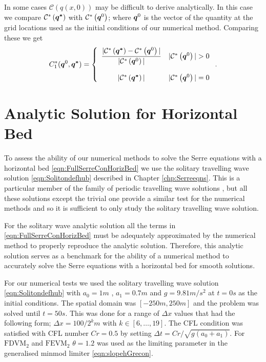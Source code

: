 In some cases $\mathcal{C}\left({q(x,0)} \right)$ may be difficult to derive analytically. In this case we compare $\mathcal{C}^*\left(\boldsymbol{q^*}\right)$ with $\mathcal{C}^*\left(\boldsymbol{q}^0\right)$; where $\boldsymbol{q}^0$ is the vector of the quantity at the grid locations used as the initial conditions of our numerical method. Comparing these we get 
\begin{equation}
C^*_1({\boldsymbol{q}^0},\boldsymbol{q^*}) =  \left\lbrace \begin{array}{c r} 
\dfrac{|\mathcal{C}^*\left({\boldsymbol{q^*}}\right) - \mathcal{C}^*\left({\boldsymbol{q}^0}\right)| }{|\mathcal{C}^*\left({\boldsymbol{q}^0}\right)|} & |\mathcal{C}^*\left({\boldsymbol{q}^0}\right)| > 0 \\ \\
|\mathcal{C}^*\left({\boldsymbol{q^*}}\right)| & |\mathcal{C}^*\left({\boldsymbol{q}^0}\right)| = 0  \end{array}\right. . 
\label{eqn:C*1qdef} 
\end{equation}


\section{Analytic Solution for Horizontal Bed}
To assess the ability of our numerical methods to solve the Serre equations with a horizontal bed \eqref{eqn:FullSerreConHorizBed} we use the solitary travelling wave solution \eqref{eqn:Solitondefhub} described in Chapter \ref{chp:Serreeqns}. This is a particular member of the family of periodic travelling wave solutions \cite{El-etal-2006}, but all these solutions except the trivial one provide a similar test for the numerical methods and so it is sufficient to only study the solitary travelling wave solution.

For the solitary wave analytic solution all the terms in \eqref{eqn:FullSerreConHorizBed} must be adequately approximated by the numerical method to properly reproduce the analytic solution. Therefore, this analytic solution serves as a benchmark for the ability of a numerical method to accurately solve the Serre equations with a horizontal bed for smooth solutions.

For our numerical tests we used the solitary travelling wave solution \eqref{eqn:Solitondefhub} with $a_0 = 1m$ , $a_1 = 0.7m$ and $g= 9.81m/s^2$ at $t=0s$ as the initial conditions. The spatial domain was $[-250m,250m]$ and the problem was solved until $t= 50s$. This was done for a range of $\Delta x$ values that had the following form; $\Delta x = 100 / 2^k m$ with $k \in  \left[6,\dots,19\right]$. The CFL condition was satisfied with CFL number $Cr = 0.5$ by setting  $\Delta t = Cr / \sqrt{g\left(a_0 + a_1\right)}$. For $\text{FDVM}_2$ and $\text{FEVM}_2$ $\theta  = 1.2$ was used as the limiting parameter in the generalised minmod limiter \eqref{eqn:slopehGrecon}. 

